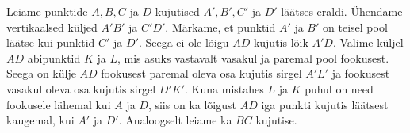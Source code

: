 Leiame punktide $A, B, C$ ja $D$ kujutised $A', B', C'$ ja $D'$ läätses eraldi. Ühendame vertikaalsed küljed $A'B'$ ja $C'D'$. Märkame, et punktid $A'$ ja $B'$ on teisel pool läätse kui punktid $C'$ ja $D'$. Seega ei ole lõigu $AD$ kujutis lõik $A'D$. Valime küljel $AD$ abipunktid $K$ ja $L$, mis asuks vastavalt vasakul ja paremal pool fookusest. Seega on külje $AD$ fookusest paremal oleva osa kujutis sirgel $A'L'$ ja fookusest vasakul oleva osa kujutis sirgel $D'K'$. Kuna mistahes $L$ ja $K$ puhul on need fookusele lähemal kui $A$ ja $D$, siis on ka lõigust $AD$ iga punkti kujutis läätsest kaugemal, kui $A'$ ja $D'$.
Analoogselt leiame ka $BC$ kujutise.
\probend
